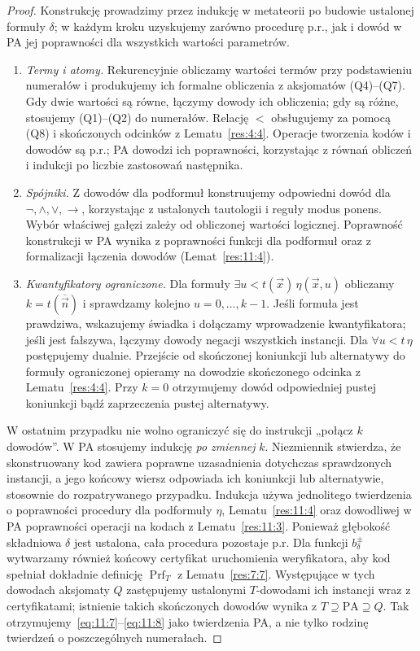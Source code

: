 \documentclass[11pt,a4paper]{article}
\numberwithin{equation}{section}
\newcommand{\PA}{\mathrm{PA}}
\theoremstyle{plain}
\theoremstyle{definition}
\theoremstyle{remark}
\begin{document}
\begin{proof}
Konstrukcję prowadzimy przez indukcję w metateorii po budowie ustalonej formuły $\delta$; w każdym kroku uzyskujemy zarówno procedurę p.r., jak i dowód w PA jej poprawności dla wszystkich wartości parametrów.
\begin{enumerate}[label=(\alph*)]
\item \emph{Termy i atomy.} Rekurencyjnie obliczamy wartości termów przy podstawieniu numerałów i produkujemy ich formalne obliczenia z aksjomatów (Q4)--(Q7). Gdy dwie wartości są równe, łączymy dowody ich obliczenia; gdy są różne, stosujemy (Q1)--(Q2) do numerałów. Relację $<$ obsługujemy za pomocą (Q8) i skończonych odcinków z Lematu~\ref{res:4:4}. Operacje tworzenia kodów i dowodów są p.r.; PA dowodzi ich poprawności, korzystając z równań obliczeń i indukcji po liczbie zastosowań następnika.
\item \emph{Spójniki.} Z dowodów dla podformuł konstruujemy odpowiedni dowód dla $\neg,\land,\lor,\to$, korzystając z ustalonych tautologii i reguły modus ponens. Wybór właściwej gałęzi zależy od obliczonej wartości logicznej. Poprawność konstrukcji w PA wynika z poprawności funkcji dla podformuł oraz z formalizacji łączenia dowodów (Lemat~\ref{res:11:4}).
\item \emph{Kwantyfikatory ograniczone.} Dla formuły $\exists u<t(\vec x)\,\eta(\vec x,u)$ obliczamy $k=t(\overline{\vec n})$ i sprawdzamy kolejno $u=0,\ldots,k-1$. Jeśli formuła jest prawdziwa, wskazujemy świadka i dołączamy wprowadzenie kwantyfikatora; jeśli jest fałszywa, łączymy dowody negacji wszystkich instancji. Dla $\forall u<t\,\eta$ postępujemy dualnie. Przejście od skończonej koniunkcji lub alternatywy do formuły ograniczonej opieramy na dowodzie skończonego odcinka z Lematu~\ref{res:4:4}. Przy $k=0$ otrzymujemy dowód odpowiedniej pustej koniunkcji bądź zaprzeczenia pustej alternatywy.
\end{enumerate}

W ostatnim przypadku nie wolno ograniczyć się do instrukcji „połącz $k$ dowodów”. W PA stosujemy indukcję \emph{po zmiennej} $k$. Niezmiennik stwierdza, że skonstruowany kod zawiera poprawne uzasadnienia dotychczas sprawdzonych instancji, a jego końcowy wiersz odpowiada ich koniunkcji lub alternatywie, stosownie do rozpatrywanego przypadku. Indukcja używa jednolitego twierdzenia o poprawności procedury dla podformuły $\eta$, Lematu~\ref{res:11:4} oraz dowodliwej w PA poprawności operacji na kodach z Lematu~\ref{res:11:3}. Ponieważ głębokość składniowa $\delta$ jest ustalona, cała procedura pozostaje p.r. Dla funkcji $b_\delta^\pm$ wytwarzamy również końcowy certyfikat uruchomienia weryfikatora, aby kod spełniał dokładnie definicję $\operatorname{Prf}_T$ z Lematu~\ref{res:7:7}. Występujące w tych dowodach aksjomaty $Q$ zastępujemy ustalonymi $T$-dowodami ich instancji wraz z certyfikatami; istnienie takich skończonych dowodów wynika z $T\supseteq\PA\supseteq Q$. Tak otrzymujemy~\eqref{eq:11:7}--\eqref{eq:11:8} jako twierdzenia PA, a nie tylko rodzinę twierdzeń o poszczególnych numerałach.


\end{proof}
\end{document}

